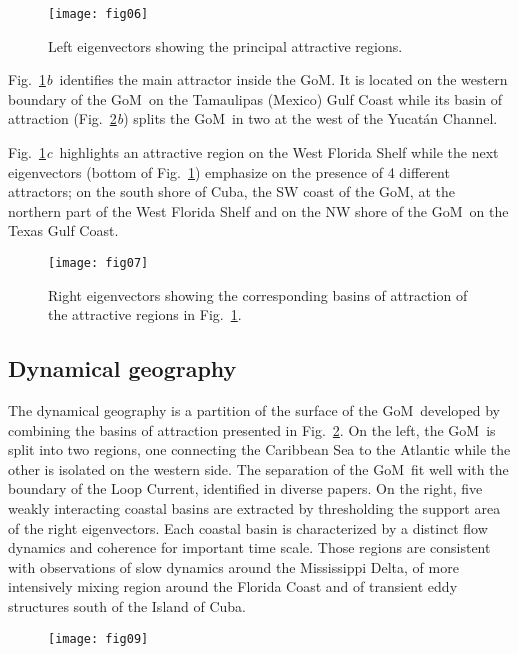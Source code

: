 \documentclass[final]{beamer}
\newcommand{\ib}{\textit{b}}
\newcommand{\ic}{\textit{c}}
\newcommand{\gom}{GoM}
\begin{document}
\begin{frame}[t]
\begin{multicols}{3}
\begin{figure}
\centering
\texttt{[image: fig06]}
\caption{Left eigenvectors showing the principal attractive regions.}
\label{fig:l_eig}
\end{figure}

Fig.~\ref{fig:l_eig}\ib\ identifies the main attractor inside the \gom. It is
located on the western boundary of the \gom\ on the Tamaulipas (Mexico) Gulf
Coast while its basin of attraction (Fig.~\ref{fig:r_eig}\ib) splits the \gom\
in two at the west of the Yucat\'{a}n Channel.
 
Fig.~\ref{fig:l_eig}\ic\ highlights an attractive region on the West Florida
Shelf while the next eigenvectors (bottom of Fig.~\ref{fig:l_eig}) emphasize on
the presence of 4 different attractors; on  the south shore of Cuba, the SW
coast of the \gom, at the northern part of the West Florida Shelf and on the NW
shore of the \gom\ on the Texas Gulf Coast.
\begin{figure}
\centering
\texttt{[image: fig07]}
\caption{Right eigenvectors showing the corresponding basins of attraction of
the attractive regions in Fig.~\ref{fig:l_eig}.}
\label{fig:r_eig}
\end{figure}

\vspace{0.5cm}
\columnbreak
\subsection{Dynamical geography}
The dynamical geography is a partition of the surface of the \gom\ developed by
combining the basins of attraction presented in Fig.~\ref{fig:r_eig}. On the
left, the \gom\ is split into two regions, one connecting the Caribbean Sea to
the Atlantic while the other is isolated on the western side. The separation of
the \gom\ fit well with the boundary of the Loop Current, identified in diverse
papers\citep{maze2015historical}. On the right, five weakly interacting coastal
basins are extracted by thresholding the support area of the right
eigenvectors. Each coastal basin is characterized by a distinct flow dynamics
and coherence for important time scale. Those regions are consistent with
observations of slow dynamics around the Mississippi Delta, of more intensively
mixing region around the Florida Coast and of transient eddy structures south
of the Island of Cuba.
\begin{figure}
\centering
\texttt{[image: fig09]}
\end{figure}


\end{multicols}
\end{frame}
\end{document}

